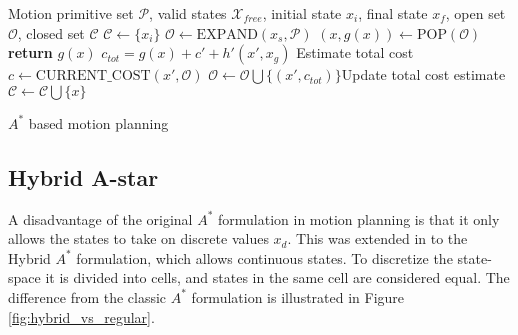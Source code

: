 \begin{algorithm}
    \begin{algorithmic}
        \Require Motion primitive set $\mathcal{P}$, valid states $\mathcal{X}_{free}$, initial state $x_i$, final state $x_f$, open set $\mathcal{O}$, closed set $\mathcal{C}$
            \State $\mathcal{C}\gets \{x_i\}$
            \State $\mathcal{O}\gets\text{EXPAND}(x_s, \mathcal{P})$
                \State $(x,g(x))\gets \text{POP}(\mathcal{O})$
                 
                    \State \textbf{return} $g(x)$
                \EndIf
                        \State $c_{tot}=g(x) + c' + h'(x', x_{g})$ \Comment Estimate total cost
                        \State $c\gets\text{CURRENT\_COST}(x', \mathcal{O})$
                            \State $\mathcal{O}\gets\mathcal{O}\bigcup\{(x',c_{tot})\}$\Comment Update total cost estimate
                        \EndIf
                    \EndIf
                \EndFor
            \State $\mathcal{C}\gets\mathcal{C}\bigcup \{x\}$
            \EndWhile
        \end{algorithmic}
        \caption{$A^*$ based motion planning}
        \label{alg:astar}
\end{algorithm}

\subsection{Hybrid A-star}
A disadvantage of the original $A^*$ formulation in motion planning is that it only allows the states to take on discrete values $x_d$. This was extended in \cite{hybrid_astar} to the Hybrid $A^*$ formulation,
which allows continuous states. To discretize the state-space it is divided into cells, and states in the same cell are considered equal. The difference from the classic $A^*$ formulation is illustrated in 
Figure \ref{fig:hybrid_vs_regular}.

